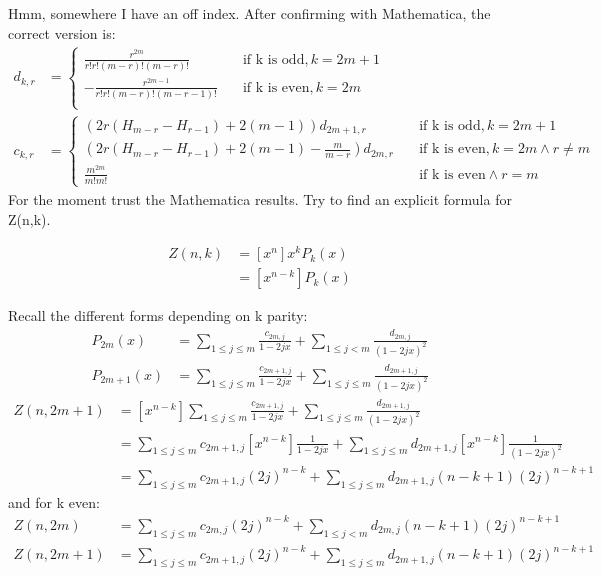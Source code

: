 \documentclass{article}
\begin{document}
Hmm, somewhere I have an off index. After confirming with Mathematica, the correct version is:
$$
\begin{aligned}
    d_{k,r} &= \begin{cases}
        \frac{r^{2m}}{r!r!(m-r)!(m-r)!} & \quad \text{if k is odd,} \, k=2m+1 \\
        -\frac{r^{2m-1}}{r!r!(m-r)!(m-r-1)!}&\quad \text{if k is even,} \, k=2m \\
    \end{cases} \\
    c_{k,r} &= \begin{cases}
        (2r(H_{m-r}-H_{r-1})+2(m-1))d_{2m+1,r} & \quad \text{if k is odd,} \, k=2m+1 \\
        (2r(H_{m-r}-H_{r-1})+2(m-1) - \frac{m}{m-r})d_{2m,r} &\quad \text{if k is even,} \, k=2m \land r\neq m\\
        \frac{m^{2m}}{m!m!} & \quad \text{if k is even} \land r=m 
    \end{cases}
\end{aligned}
$$
For the moment trust the Mathematica results. Try to find an explicit formula for Z(n,k).

$$
\begin{aligned}
    Z(n,k) 
    &= [x^n] x^k P_k(x) \\
    &=[x^{n-k}]P_k(x)
\end{aligned}
$$

Recall the different forms depending on k parity:
$$
\begin{aligned}
P_{2m}(x) &= \sum_{1 \leq j \leq m} \frac{c_{2m,j}}{1-2jx} + \sum_{1 \leq j < m} \frac{d_{2m,j}}{(1-2jx)^2} \\
P_{2m+1}(x) &= \sum_{1 \leq j \leq m} \frac{c_{2m+1,j}}{1-2jx} + \sum_{1 \leq j \leq m} \frac{d_{2m+1,j}}{(1-2jx)^2}
\end{aligned}
$$
$$
\begin{aligned}
    Z(n,2m+1)  
    &= [x^{n-k}] \sum_{1 \leq j \leq m} \frac{c_{2m+1,j}}{1-2jx} + \sum_{1 \leq j \leq m} \frac{d_{2m+1,j}}{(1-2jx)^2} \\
     &= \sum_{1 \leq j \leq m}c_{2m+1,j}[x^{n-k}]  \frac{1}{1-2jx} + \sum_{1 \leq j \leq m} d_{2m+1,j}[x^{n-k}]\frac{1}{(1-2jx)^2} \\ 
     &= \sum_{1 \leq j \leq m}c_{2m+1,j}(2j)^{n-k} + \sum_{1 \leq j \leq m} d_{2m+1,j}(n-k+1)(2j)^{n-k+1}
\end{aligned}
$$
and for k even:
$$
\begin{aligned}
    Z(n,2m)  
     &= \sum_{1 \leq j \leq m}c_{2m,j}(2j)^{n-k} + \sum_{1 \leq j < m} d_{2m,j}(n-k+1)(2j)^{n-k+1} \\
    Z(n,2m+1)  
     &= \sum_{1 \leq j \leq m}c_{2m+1,j}(2j)^{n-k} + \sum_{1 \leq j \leq m} d_{2m+1,j}(n-k+1)(2j)^{n-k+1}
\end{aligned}
$$
\end{document}
